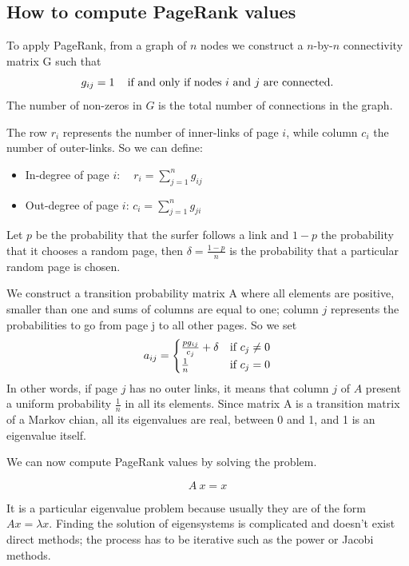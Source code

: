 \documentclass[]{usiinfbachelorproject}
\newcommand\tab[1][1cm]{\hspace*{#1}}
\begin{document}
\subsection{How to compute PageRank values}
To apply PageRank, from a graph of $n$ nodes we construct a $n$-by-$n$ connectivity matrix G such that
\begin{equation*}
g_{ij}=1 \text{\;\;\; if and only if nodes $i$ and $j$ are connected.} 
\end{equation*}
The number of non-zeros in $G$ is the total number of connections in the graph.

The row $r_i$ represents the number of inner-links of page $i$, while column $c_i$ the number of outer-links. So we can define:
\begin{itemize}
\item In-degree of page $i$: \tab $\:\:\:\:r_i = \sum\limits_{j=1}^{n} g_{ij}$
\item Out-degree of page $i$: \tab $c_i = \sum\limits_{j=1}^{n} g_{ji}$
\end{itemize}
Let $p$ be the probability that the surfer follows a link and $1-p$ the probability that it chooses a random page, then $\delta = \frac{1-p}{n}$ is the probability that a particular random page is chosen.

We construct a transition probability matrix A where all elements are positive, smaller than one and sums of columns are equal to one; column $j$ represents the probabilities to go from page j to all other pages. So we set
\begin{equation}\notag
a_{ij} = 
\begin{cases}
\frac{pg_{ij}}{c_{j}} + \delta  & \text{if } c_{j} \neq 0\\
\frac{1}{n} & \text{if } c_{j} = 0
\end{cases}
\end{equation}
In other words, if page $j$ has no outer links, it means that column $j$ of $A$ present a uniform probability $\frac{1}{n}$ in all its elements. Since matrix A is a transition matrix of a Markov chian, all its eigenvalues are real, between 0 and 1, and 1 is an eigenvalue itself. 

We can now compute PageRank values by solving the problem. 

\begin{equation}
A\:x = x
\end{equation}

It is a particular eigenvalue problem because usually they are of the form $Ax=\lambda x$. Finding the solution of eigensystems is complicated and doesn't exist direct methods; the process has to be iterative such as the power or Jacobi methods.
\end{document}
